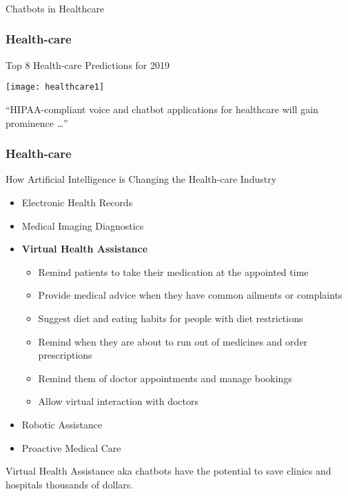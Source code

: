 \begin{frame}[fragile]\frametitle{}
\begin{center}
{\Large Chatbots in Healthcare}
\end{center}
\end{frame}

\begin{frame}[fragile]\frametitle{Health-care}
Top 8 Health-care Predictions for 2019

\begin{center}
\texttt{[image: healthcare1]}
\end{center}

``HIPAA-compliant voice and chatbot applications for healthcare will gain prominence \ldots''

\end{frame}

\begin{frame}[fragile]\frametitle{Health-care}
How Artificial Intelligence is Changing the Health-care Industry

\begin{itemize}
\item Electronic Health Records
\item Medical Imaging Diagnostics
\item {\bf Virtual Health Assistance}
\begin{itemize}
\item Remind patients to take their medication at the appointed time
\item Provide medical advice when they have common ailments or complaints
\item  Suggest diet and eating habits for people with diet restrictions
\item  Remind when they are about to run out of medicines and order prescriptions
\item  Remind them of doctor appointments and manage bookings
\item  Allow virtual interaction with doctors
\end{itemize}
\item Robotic Assistance
\item Proactive Medical Care
\end{itemize}

Virtual Health Assistance aka chatbots have the potential to save clinics and hospitals thousands of dollars.

\end{frame}

